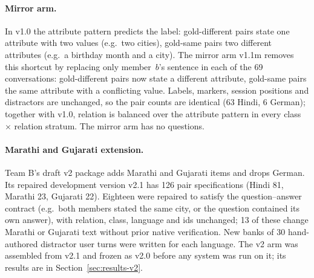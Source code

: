 \paragraph{Mirror arm.} In v1.0 the attribute pattern predicts the label: gold-different pairs state one attribute with two values (e.g.\
two cities), gold-same pairs two different attributes (e.g.\ a birthday month and a city). The mirror arm v1.1m removes this shortcut by
replacing only member~$b$'s sentence in each of the 69 conversations: gold-different pairs now state a different attribute, gold-same
pairs the same attribute with a conflicting value. Labels, markers, session positions and distractors are unchanged, so the pair counts
are identical (63 Hindi, 6 German); together with v1.0, relation is balanced over the attribute pattern in every class $\times$ relation
stratum. The mirror arm has no questions.

\paragraph{Marathi and Gujarati extension.} Team B's draft v2 package adds Marathi and Gujarati items and drops German. Its repaired
development version v2.1 has 126 pair specifications (Hindi 81, Marathi 23, Gujarati 22). Eighteen were repaired to satisfy the
question--answer contract (e.g.\ both members stated the same city, or the question contained its own answer), with relation, class,
language and ids unchanged; 13 of these change Marathi or Gujarati text without prior native verification. New banks of 30 hand-authored
distractor user turns were written for each language. The v2 arm was assembled from v2.1 and frozen as v2.0 before any system was run on
it; its results are in Section~\ref{sec:results-v2}.

